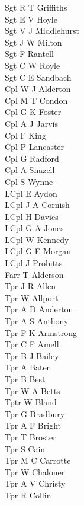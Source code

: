 \begin{multicols}{3}
  \small
  \noindent
  Sgt R T Griffiths \\
  Sgt E V Hoyle \\
  Sgt V J Middlehurst \\
  Sgt J W Milton \\
  Sgt F Rantell \\
  Sgt C W Royle \\
  Sgt C E Sandbach \\
  Cpl W J Alderton \\
  Cpl M T Condon \\
  Cpl G K Foster \\
  Cpl A J Jarvis \\
  Cpl F King \\
  Cpl P Lancaster \\
  Cpl G Radford \\
  Cpl A Snazell \\
  Cpl S Wynne \\
  LCpl E Aydon \\
  LCpl J A Cornish \\
  LCpl H Davies \\
  LCpl G A Jones \\
  LCpl W Kennedy \\
  LCpl G E Morgan \\
  LCpl J Probitts \\
  Farr T Alderson \\
  Tpr J R Allen \\
  Tpr W Allport \\
  Tpr A D Anderton \\
  Tpr A S Anthony \\
  Tpr F K Armstrong \\
  Tpr C F Amell \\
  Tpr B J Bailey \\
  Tpr A Bater \\
  Tpr B Best \\
  Tpr W A Betts \\
  Tptr W Bland \\
  Tpr G Bradbury \\
  Tpr A F Bright \\
  Tpr T Broster \\
  Tpr S Cain \\
  Tpr M C Carrotte \\
  Tpr W Chaloner \\
  Tpr A V Christy \\
  Tpr R Collin \\

\end{multicols}
